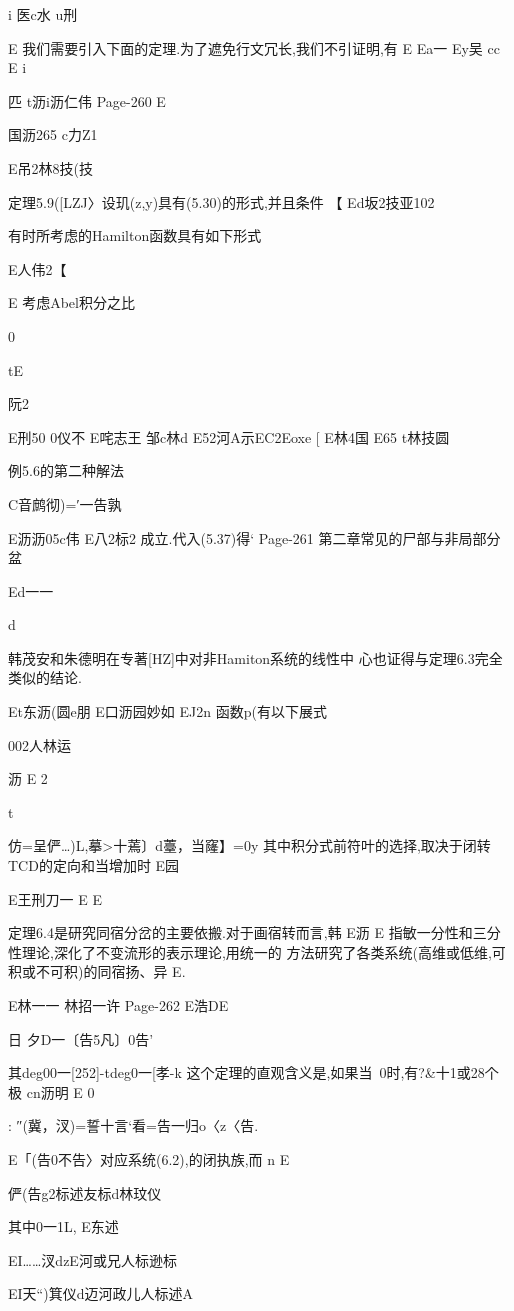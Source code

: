 {{{{{{{{{{{{{{{i
医c水
u刑

E
我们需要引入下面的定理.为了遮免行文冗长,我们不引证明,有
E
Ea一
Ey吴
cc
E
i

匹
t沥i沥仁伟
Page-260
E

国沥265
c力Z1

E吊2林8技(技

定理5.9([LZJ〉设玑(z,y)具有(5.30)的形式,并且条件
【
Ed坂2技亚102

有时所考虑的Hamilton函数具有如下形式

E人伟2【

E
考虑Abel积分之比

0

tE

阮2

E刑50
0仪不
E咤志王
邹c林d
E52河A示EC2Eoxe
[
E林4国
E65
t林技圆

例5.6的第二种解法

C音鹧彻)=′一告孰

E沥沥05c伟
E八2标2
成立.代入(5.37)得`
Page-261
第二章常见的尸部与非局部分盆

Ed一一

d

韩茂安和朱德明在专著[HZ]中对非Hamiton系统的线性中
心也证得与定理6.3完全类似的结论.

Et东沥(圆e朋
E口沥园妙如
EJ2n
函数p(有以下展式

002人林运

沥
E
2

t

仿=呈俨…)L,摹>十蔫〕d薹，当窿】=0y
其中积分式前符叶的选择,取决于闭转TCD的定向和当增加时
E园

E王刑刀一
E
E

定理6.4是研究同宿分岔的主要依搬.对于画宿转而言,韩
E沥
E
指敏一分性和三分性理论,深化了不变流形的表示理论,用统一的
方法研究了各类系统(高维或低维,可积或不可积)的同宿扬、异
E.

E林一一
林招一许
Page-262
E浩DE

日
夕D一〔告5凡〕0告'

其deg00一[252]-tdeg0一[孝-k
这个定理的直观含义是,如果当~0时,有?&十1或28个极
cn沥明
E
0

:
″(冀，汊)=誓十言`看=告一归o〈z〈告.

E「(告0不告〉对应系统(6.2),的闭执族,而
n
E

俨(告g2标述友标d林玟仪

其中0一1L,
E东述

EI……汊dzE河或兄人标逊标

EI天“)箕仪d迈河政儿人标述A

}}}}}}}}}}}}}}}
